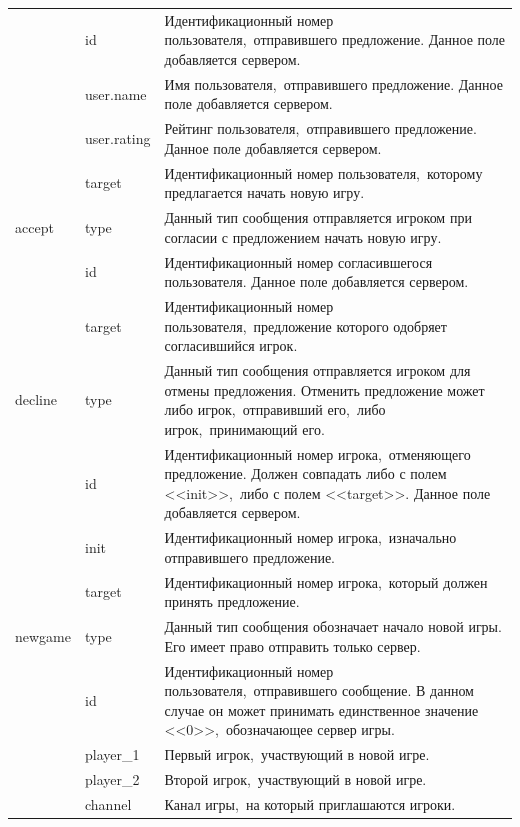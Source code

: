\documentclass[14pt,a4paper]{report}
\begin{document}
\begin{longtable}{| l | l | p{11cm} |}
 & id & Идентификационный номер пользователя,~отправившего предложение. Данное поле добавляется сервером.\\*\cline{2-3}
 & user.name & Имя пользователя,~отправившего предложение. Данное поле добавляется сервером.\\*\cline{2-3}
 & user.rating & Рейтинг пользователя,~отправившего предложение. Данное поле добавляется сервером.\\*\cline{2-3}
 & target & Идентификационный номер пользователя,~которому предлагается начать новую игру.\\*\hline
accept & type & Данный тип сообщения отправляется игроком при согласии с предложением начать новую игру.\\*\cline{2-3}
 & id & Идентификационный номер согласившегося пользователя. Данное поле добавляется сервером.\\*\cline{2-3}
 & target & Идентификационный номер пользователя,~предложение которого одобряет согласившийся игрок.\\*\hline
decline & type & Данный тип сообщения отправляется игроком для отмены предложения. Отменить предложение может либо игрок,~отправивший его,~либо игрок,~принимающий его. \\*\cline{2-3}
 & id & Идентификационный номер игрока,~отменяющего предложение. Должен совпадать либо с полем <<init>>,~либо с полем <<target>>. Данное поле добавляется сервером.\\*\cline{2-3}
 & init & Идентификационный номер игрока,~изначально отправившего предложение.\\*\cline{2-3}
 & target & Идентификационный номер игрока,~который должен принять предложение.\\*\hline
newgame & type & Данный тип сообщения обозначает начало новой игры. Его имеет право отправить только сервер.\\*\cline{2-3}
 & id & Идентификационный номер пользователя,~отправившего сообщение. В данном случае он может принимать единственное значение <<0>>,~обозначающее сервер игры.\\*\cline{2-3}
 & player\_1 & Первый игрок,~участвующий в новой игре.\\*\cline{2-3}
 & player\_2 & Второй игрок,~участвующий в новой игре.\\*\cline{2-3}
 & channel & Канал игры,~на который приглашаются игроки.\\*\hline
\end{longtable}
\end{document}
